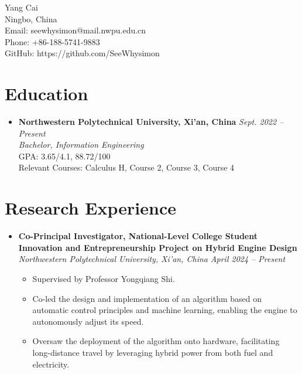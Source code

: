 \documentclass[a4paper,10pt]{article}
\begin{document}
\begin{center}
    {\LARGE Yang Cai}\\
    \vspace{0.1cm}
    Ningbo, China \\
    Email: seewhysimon@mail.nwpu.edu.cn \\
    Phone: +86-188-5741-9883 \\
    GitHub: https://github.com/SeeWhysimon
\end{center}

\section*{Education}
\begin{itemize}[leftmargin=0.5cm]
    \item \textbf{Northwestern Polytechnical University, Xi'an, China} \hfill \textit{Sept. 2022 -- Present} \\
    \textit{Bachelor, Information Engineering} \\
    GPA: 3.65/4.1, 88.72/100 \\
    Relevant Courses: Calculus H, Course 2, Course 3, Course 4
\end{itemize}

\section*{Research Experience}
\begin{itemize}[leftmargin=0.5cm]
    \item \textbf{Co-Principal Investigator, National-Level College Student Innovation and Entrepreneurship Project on Hybrid Engine Design} \\
    \textit{Northwestern Polytechnical University, Xi'an, China} \hfill \textit{April 2024 -- Present} 
    
    \begin{itemize}
        \item Supervised by Professor Yongqiang Shi.
        \item Co-led the design and implementation of an algorithm based on automatic control principles and machine learning, enabling the engine to autonomously adjust its speed.
        \item Oversaw the deployment of the algorithm onto hardware, facilitating long-distance travel by leveraging hybrid power from both fuel and electricity.
    \end{itemize}
    
\end{itemize}
\end{document}
